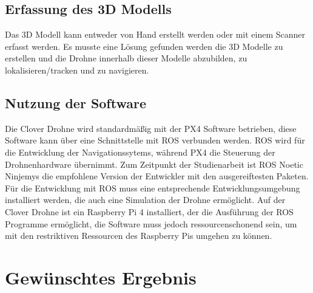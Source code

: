 \subsection{Erfassung des 3D Modells} \label{erfassung_des_3d-modells:subsection}

Das 3D Modell kann entweder von Hand erstellt werden oder mit einem Scanner erfasst werden. Es musste eine Lösung gefunden werden die 3D Modelle zu erstellen und die Drohne innerhalb dieser Modelle abzubilden, zu lokalisieren/tracken und zu navigieren. 

\subsection{Nutzung der Software} \label{nutzung_der_software:subsection}

Die Clover Drohne wird standardmäßig mit der PX4 Software betrieben, diese Software kann über eine Schnittstelle mit \ac{ROS} verbunden werden. \ac{ROS} wird für die Entwicklung der Navigationssytems, während PX4 die Steuerung der Drohnenhardware übernimmt. Zum Zeitpunkt der Studienarbeit ist \ac{ROS} Noetic Ninjemys die empfohlene  Version der Entwickler mit den ausgereiftesten Paketen.
Für die Entwicklung mit \ac{ROS} muss eine entsprechende Entwicklungsumgebung installiert werden, die auch eine Simulation der Drohne ermöglicht. Auf der Clover Drohne ist ein Raspberry Pi 4 installiert, der die Ausführung der \ac{ROS} Programme ermöglicht, die Software muss jedoch ressourcenschonend sein, um mit den restriktiven Ressourcen des Raspberry Pis umgehen zu können. 


\section{Gewünschtes Ergebnis} \label{gewuenschtes_ergebnis:section} 



